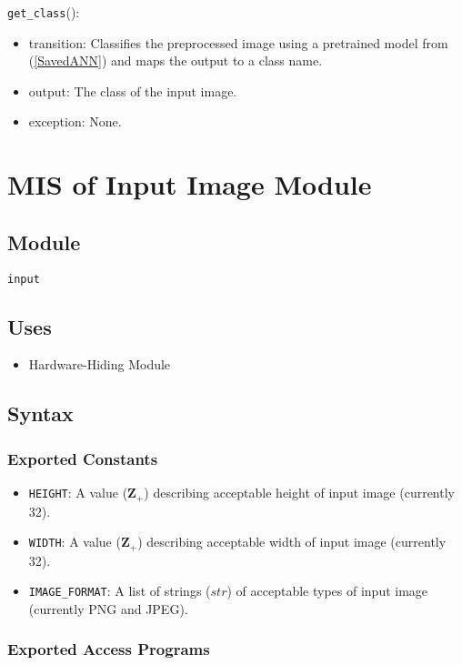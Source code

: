 \documentclass[12pt, titlepage]{article}
\def\code#1{\texttt{#1}}
\begin{document}
\noindent \code{get\_class}():
\begin{itemize}
  \item transition: Classifies the preprocessed image using a pretrained model from (\ref{SavedANN}) and 
                    maps the output to a class name.
  \item output: The class of the input image.
  \item exception: None.
\end{itemize}

\newpage

\section{MIS of Input Image Module} \label{In-set} 

\subsection{Module}
\code{input} 

\subsection{Uses}
\begin{itemize}
  \item Hardware-Hiding Module  
\end{itemize}


\subsection{Syntax}

\subsubsection{Exported Constants}
\begin{itemize}
  \item \code{HEIGHT}: A value ($\mathbf{Z}_{+}$) describing acceptable height of input image 
  (currently 32).
  \item \code{WIDTH}: A value ($\mathbf{Z}_{+}$) describing acceptable width of input image
  (currently 32).
  \item \code{IMAGE\_FORMAT}: A list of strings ($str$) of acceptable types of input image 
  (currently PNG and JPEG).
\end{itemize}

\subsubsection{Exported Access Programs}
\end{document}

